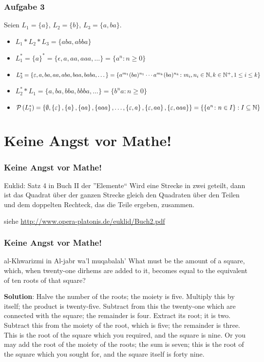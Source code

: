 \documentclass{beamer}
\begin{document}
\begin{frame} \frametitle{Aufgabe 3}
	Seien $L_1 = \{a\}$, $L_2 = \{b\}$, $L_3 = \{a,ba\}$.
	
	\begin{itemize}[leftmargin=*]
		\item $L_1 * L_2 * L_3 = \{aba,abba\}$
		\item $L_1^\ast = \{a\}^\ast = \{\epsilon,a,aa,aaa, \dots\} = \{a^n \colon n \ge 0\}$
	 	\item $L_3^\ast = \{\varepsilon, a,ba,aa,aba,baa,baba,\dots\} = \{a^{m_1}(ba)^{n_1} \cdots a^{m_k}(ba)^{n_k} \colon m_i, n_i \in \mathbb{N}, k \in \mathbb{N}^+, 1 \le i \le k\}$
	 	\item $L_2^\ast * L_1 = \{a,ba,bba,bbba,\dots\} = \{b^n a \colon n \ge 0\}$
	 	\item $\mathcal{P}\left( L_1^\ast \right) = \left\{ \emptyset, \left\{ \varepsilon \right\}, \left\{ a \right\}, \left\{ aa \right\}, \left\{ aaa \right\}, \dots , \left\{ \varepsilon, a \right\}, \left\{ \varepsilon,aa \right\}, \left\{ \varepsilon,aaa \right\} \right\} = \left\{ \left\{ a^n \colon n \in I \right\} : I \subseteq \mathbb{N} \right\}$
	\end{itemize}
\end{frame}

\section{Keine Angst vor Mathe!}

\begin{frame} \frametitle{Keine Angst vor Mathe!}
	\begin{block}{Euklid: Satz 4 in Buch II der ''Elemente``}
		Wird eine Strecke in zwei geteilt, dann ist das Quadrat über der ganzen Strecke gleich den Quadraten über den Teilen und dem doppelten Rechteck, das die Teile ergeben, zusammen.
	\end{block}


	\small siehe \url{http://www.opera-platonis.de/euklid/Buch2.pdf}
\end{frame}

\begin{frame} \frametitle{Keine Angst vor Mathe!}
	\begin{block}{al-Khwarizmi in Al-jabr wa'l muqabalah'}
		\small What must be the amount of a square, which, when twenty-one
		dirhems are added to it, becomes equal to the equivalent of ten
		roots of that square?
		
		\textbf{Solution}: Halve the number of the roots; the moiety is five.
		Multiply this by itself; the product is twenty-five. Subtract from
		this the twenty-one which are connected with the square; the
		remainder is four. Extract its root; it is two. Subtract this from
		the moiety of the root, which is five; the remainder is three. This
		is the root of the square which you required, and the square is
		nine. Or you may add the root of the moiety of the roots; the
		sum is seven; this is the root of the square which you sought for,
		and the square itself is forty nine.
	\end{block}
\end{frame}
\end{document}
